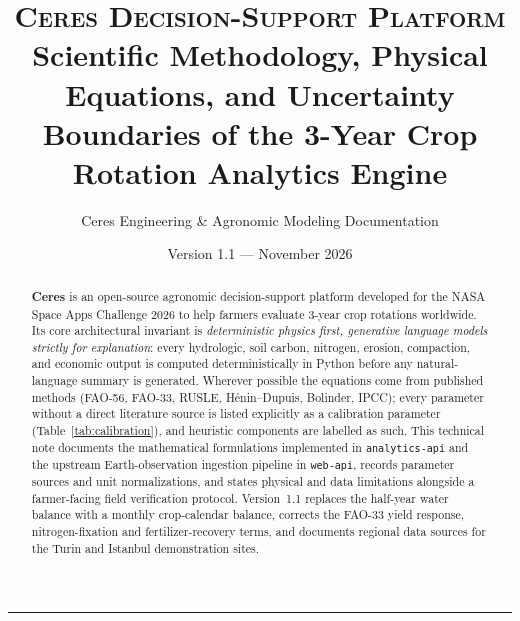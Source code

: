 \documentclass[11pt,a4paper]{article}
\title{%
  \vspace{-1.0cm}
  {\large\color{ceresaccent}\textsc{Ceres Decision-Support Platform}}\\[0.35em]
  \textbf{Scientific Methodology, Physical Equations, and Uncertainty Boundaries of the 3-Year Crop Rotation Analytics Engine}
}
\author{Ceres Engineering \& Agronomic Modeling Documentation}
\date{Version 1.1 --- November 2026}
\begin{document}
\maketitle

\begin{abstract}
\textbf{Ceres} is an open-source agronomic decision-support platform developed for the NASA Space Apps Challenge 2026 to help farmers evaluate 3-year crop rotations worldwide. Its core architectural invariant is \emph{deterministic physics first, generative language models strictly for explanation}: every hydrologic, soil carbon, nitrogen, erosion, compaction, and economic output is computed deterministically in Python before any natural-language summary is generated. Wherever possible the equations come from published methods (FAO-56, FAO-33, RUSLE, H{\'e}nin--Dupuis, Bolinder, IPCC); every parameter without a direct literature source is listed explicitly as a calibration parameter (Table~\ref{tab:calibration}), and heuristic components are labelled as such. This technical note documents the mathematical formulations implemented in \texttt{analytics-api} and the upstream Earth-observation ingestion pipeline in \texttt{web-api}, records parameter sources and unit normalizations, and states physical and data limitations alongside a farmer-facing field verification protocol. Version~1.1 replaces the half-year water balance with a monthly crop-calendar balance, corrects the FAO-33 yield response, nitrogen-fixation and fertilizer-recovery terms, and documents regional data sources for the Turin and Istanbul demonstration sites.
\end{abstract}

\tableofcontents
\vspace{0.8em}
\hrule
\vspace{0.8em}









\end{document}
